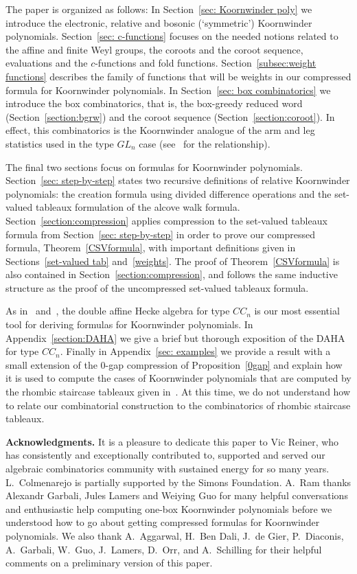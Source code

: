 \documentclass[11pt]{article}
\theoremstyle{plain}
\theoremstyle{definition}
\theoremstyle{remark}
\numberwithin{equation}{section}
\newcounter{r}
\newcounter{s}
\begin{document}
The paper is organized as follows: In Section~\ref{sec: Koornwinder poly} we introduce the electronic, relative and bosonic (`symmetric') Koornwinder polynomials. Section~\ref{sec: c-functions} focuses on the needed notions related to the affine and finite Weyl groups, the coroots and the coroot sequence, evaluations and the $c$-functions and fold functions. 
Section~\ref{subsec:weight functions} describes the family of functions that will be weights in our compressed formula for Koornwinder polynomials.  
In Section~\ref{sec: box combinatorics} we introduce the box combinatorics, that is, the box-greedy reduced word (Section~\ref{section:bgrw}) and the coroot sequence (Section~\ref{section:coroot}).  In effect, this combinatorics is the Koornwinder analogue of the arm and leg statistics used in the type $GL_n$ case (see~\cite[Remark 2.3]{GR21} for the relationship).

The final two sections focus on formulas for Koornwinder polynomials.  
Section~\ref{sec: step-by-step} states two recursive definitions of relative Koornwinder polynomials: the creation formula using divided difference operations and the set-valued tableaux formulation of the alcove walk formula.  
Section~\ref{section:compression} applies compression to the set-valued tableaux formula from Section~\ref{sec: step-by-step} in order to prove our compressed formula, Theorem~\ref{CSVformula}, with important definitions given in Sections~\ref{set-valued tab} and~\ref{weights}. The proof of Theorem~\ref{CSVformula} is also contained in Section~\ref{section:compression}, and follows the same inductive structure as the proof of the uncompressed set-valued tableaux formula.

As in~\cite{Mac03} and~\cite{GR21}, the double affine Hecke algebra for type $CC_n$ is our most essential tool for deriving formulas for Koornwinder polynomials.  
In Appendix~\ref{section:DAHA} we give a brief but thorough exposition of the DAHA for type $CC_n$.
Finally in Appendix~\ref{sec: examples} we provide a result with a small extension of the 0-gap compression of
Proposition~\ref{0gap} and explain how it is used to compute the cases of Koornwinder polynomials that are computed by the rhombic staircase tableaux given in~\cite[Theorem 1.10]{CMW18}.  At this time, we do not understand how to relate our combinatorial construction to the combinatorics of
rhombic staircase tableaux.

\bigskip\noindent
\textbf{Acknowledgments.} It is a pleasure to dedicate this paper to Vic Reiner, who has consistently and exceptionally contributed to, 
supported and served our algebraic combinatorics community with sustained energy for so many years. L.\ Colmenarejo is partially supported by the Simons Foundation. A.\ Ram thanks Alexandr Garbali, Jules Lamers and Weiying Guo for many helpful conversations and enthusiastic help computing one-box Koornwinder polynomials before we understood how to go about getting compressed formulas for Koornwinder polynomials.  We also thank A.~Aggarwal, H.~Ben Dali, J.~de Gier, P.~Diaconis, A.~Garbali, W.~Guo, J.~Lamers, D.~Orr, and A.~Schilling for their helpful comments on a preliminary version of this paper.  
\end{document}
